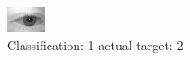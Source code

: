 \begin{figure}[h!]
\begin{center}
\includegraphics[width=0.60\columnwidth]{figures/ID488_class_1_target_2.png}
\end{center}
\caption{ Classification: 1 actual target: 2}
\label{fig:ID488_class_1_target_2}
\end{figure}
